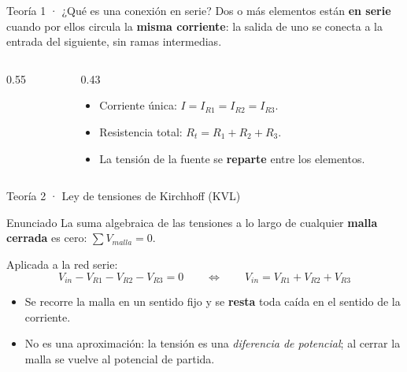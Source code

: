\documentclass[aspectratio=169]{beamer}
\begin{document}
\begin{frame}{Teoría 1 · ¿Qué es una conexión en serie?}
  Dos o más elementos están \textbf{en serie} cuando por ellos circula la
  \textbf{misma corriente}: la salida de uno se conecta a la entrada del
  siguiente, sin ramas intermedias.

  \begin{columns}[T]
    \begin{column}{0.55\textwidth}
    \end{column}
    \begin{column}{0.43\textwidth}
      \begin{itemize}
        \item Corriente única: $I = I_{R1} = I_{R2} = I_{R3}$.
        \item Resistencia total: $R_t = R_1 + R_2 + R_3$.
        \item La tensión de la fuente se \textbf{reparte} entre los elementos.
      \end{itemize}
    \end{column}
  \end{columns}
\end{frame}

\begin{frame}{Teoría 2 · Ley de tensiones de Kirchhoff (KVL)}
  \begin{block}{Enunciado}
    La suma algebraica de las tensiones a lo largo de cualquier \textbf{malla
    cerrada} es cero: $\displaystyle\sum V_{malla} = 0$.
  \end{block}
  \pause
  Aplicada a la red serie:
  \[
    V_{in} - V_{R1} - V_{R2} - V_{R3} = 0
    \qquad\Longleftrightarrow\qquad
    V_{in} = V_{R1} + V_{R2} + V_{R3}
  \]
  \pause
  \begin{itemize}
    \item Se recorre la malla en un sentido fijo y se \textbf{resta} toda caída en el sentido de la corriente.
    \item No es una aproximación: la tensión es una \emph{diferencia de potencial}; al cerrar la malla se vuelve al potencial de partida.
  \end{itemize}
\end{frame}
\end{document}
